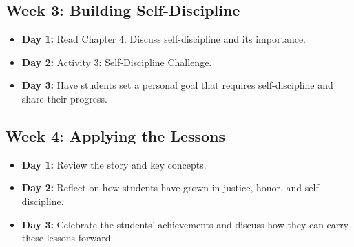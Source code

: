 \documentclass[11pt]{article}
\begin{document}
\subsection{Week 3: Building Self-Discipline}
\label{sec:orgd141a15}
\begin{itemize}
\item \textbf{\textbf{Day 1:}} Read Chapter 4. Discuss self-discipline and its importance.
\item \textbf{\textbf{Day 2:}} Activity 3: Self-Discipline Challenge.
\item \textbf{\textbf{Day 3:}} Have students set a personal goal that requires self-discipline and share their progress.
\end{itemize}

\subsection{Week 4: Applying the Lessons}
\label{sec:org714a6ad}
\begin{itemize}
\item \textbf{\textbf{Day 1:}} Review the story and key concepts.
\item \textbf{\textbf{Day 2:}} Reflect on how students have grown in justice, honor, and self-discipline.
\item \textbf{\textbf{Day 3:}} Celebrate the students’ achievements and discuss how they can carry these lessons forward.
\end{itemize}
\end{document}
